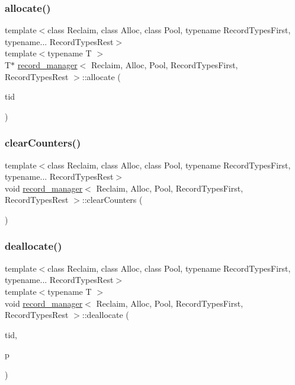 \subsubsection{\texorpdfstring{allocate()}{allocate()}}
{\footnotesize\ttfamily template$<$class Reclaim, class Alloc, class Pool, typename Record\+Types\+First, typename... Record\+Types\+Rest$>$ \\
template$<$typename T $>$ \\
T$\ast$ \hyperlink{classrecord__manager}{record\+\_\+manager}$<$ Reclaim, Alloc, Pool, Record\+Types\+First, Record\+Types\+Rest $>$\+::allocate (\begin{DoxyParamCaption}\item[{const int}]{tid }\end{DoxyParamCaption})\hspace{0.3cm}{\ttfamily [inline]}}

\mbox{\label{classrecord__manager_a74dca7b17e0e0d9980a3c4bc7f413905}} 
\subsubsection{\texorpdfstring{clear\+Counters()}{clearCounters()}}
{\footnotesize\ttfamily template$<$class Reclaim, class Alloc, class Pool, typename Record\+Types\+First, typename... Record\+Types\+Rest$>$ \\
void \hyperlink{classrecord__manager}{record\+\_\+manager}$<$ Reclaim, Alloc, Pool, Record\+Types\+First, Record\+Types\+Rest $>$\+::clear\+Counters (\begin{DoxyParamCaption}\item[{void}]{ }\end{DoxyParamCaption})\hspace{0.3cm}{\ttfamily [inline]}}

\mbox{\label{classrecord__manager_a31dfab27fb2e11e14566eb822dbb09ec}} 
\subsubsection{\texorpdfstring{deallocate()}{deallocate()}}
{\footnotesize\ttfamily template$<$class Reclaim, class Alloc, class Pool, typename Record\+Types\+First, typename... Record\+Types\+Rest$>$ \\
template$<$typename T $>$ \\
void \hyperlink{classrecord__manager}{record\+\_\+manager}$<$ Reclaim, Alloc, Pool, Record\+Types\+First, Record\+Types\+Rest $>$\+::deallocate (\begin{DoxyParamCaption}\item[{const int}]{tid,  }\item[{T $\ast$const}]{p }\end{DoxyParamCaption})\hspace{0.3cm}{\ttfamily [inline]}}

